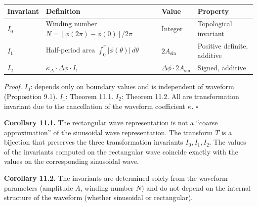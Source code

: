 \documentclass[a4paper,11pt]{article}
\newcounter{none}
\begin{document}
{\def\LTcaptype{none} %
\begin{longtable}[]{@{}
  >{\centering\arraybackslash}p{}
  >{\raggedright\arraybackslash}p{}
  >{\raggedright\arraybackslash}p{}
  >{\raggedright\arraybackslash}p{}@{}}
\toprule\noalign{}
\begin{minipage}[b]{\linewidth}\centering
Invariant
\end{minipage} & \begin{minipage}[b]{\linewidth}\raggedright
Definition
\end{minipage} & \begin{minipage}[b]{\linewidth}\raggedright
Value
\end{minipage} & \begin{minipage}[b]{\linewidth}\raggedright
Property
\end{minipage} \\
\midrule\noalign{}
\endhead
\bottomrule\noalign{}
\endlastfoot
\(I_0\) & Winding number \(N = [\phi(2\pi) - \phi(0)] / 2\pi\) & Integer
& Topological invariant \\
\(I_1\) & Half-period area \(\int_0^{\pi} |\phi(\theta)|\, d\theta\) &
\(2A_{\sin}\) & Positive definite, additive \\
\(I_2\) & \(\kappa_\Delta \cdot \Delta\phi \cdot I_1\) &
\(\Delta\phi \cdot 2A_{\sin}\) & Signed, additive \\
\end{longtable}
}

\emph{Proof.} \(I_0\): depends only on boundary values and is
independent of waveform (Proposition 9.1). \(I_1\): Theorem 11.1.
\(I_2\): Theorem 11.2. All are transformation invariant due to the
cancellation of the waveform coefficient \(\kappa\). \(\square\)

\textbf{Corollary 11.1.} The rectangular wave representation is not a
``coarse approximation'' of the sinusoidal wave representation. The
transform \(T\) is a bijection that preserves the three transformation
invariants \(I_0, I_1, I_2\). The values of the invariants computed on
the rectangular wave coincide exactly with the values on the
corresponding sinusoidal wave.

\textbf{Corollary 11.2.} The invariants are determined solely from the
waveform parameters (amplitude \(A\), winding number \(N\)) and do not
depend on the internal structure of the waveform (whether sinusoidal or
rectangular).
\end{document}
